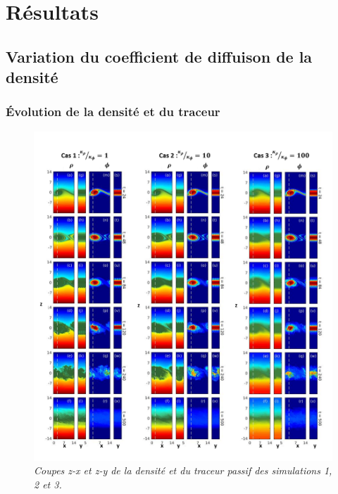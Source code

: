 \documentclass[a4paper,12pt]{article}
\begin{document}
\newpage
\section{Résultats}

  \subsection{Variation du coefficient de diffuison de la densité}
  
    \subsubsection{Évolution de la densité et du traceur}

    \begin{figure}[!h]
        \centering
        \includegraphics[width=0.95\linewidth]{figures/rhodiff_contour.png}
        \caption{\textit{Coupes z-x et z-y de la densité et du traceur passif des simulations 1, 2 et 3.}}
        \label{rhodiff}
    \end{figure}
    
\end{document}
